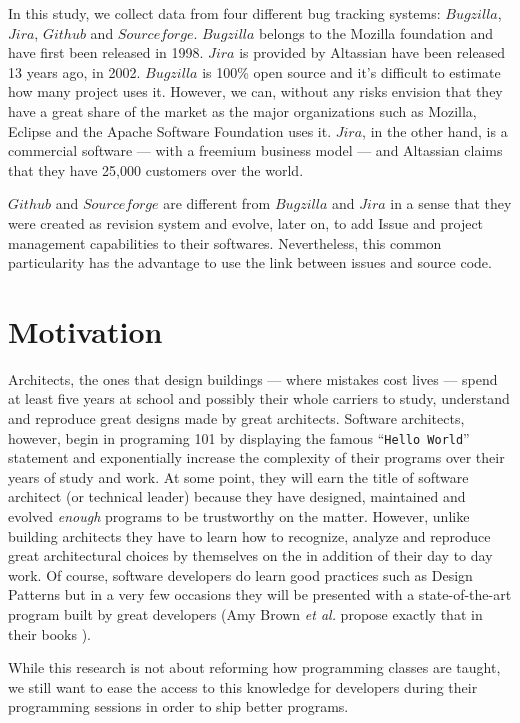  In this study, we collect data from four different bug tracking systems: $Bugzilla$, $Jira$, $Github$ and $Sourceforge$. $Bugzilla$ belongs to the Mozilla foundation and have first been released in 1998. $Jira$ is provided by Altassian have been released 13 years ago, in 2002. $Bugzilla$ is 100\% open source and it's difficult to estimate how many project uses it.
 However, we can, without any risks envision that they have a great share of the market as the major organizations such as Mozilla, Eclipse and the Apache Software Foundation uses it.
 $Jira$, in the other hand, is a commercial software --- with a freemium business model --- and Altassian claims that they have 25,000 customers over the world.

 $Github$ and $Sourceforge$ are different from $Bugzilla$ and $Jira$ in a sense that they were created as revision system and evolve, later on, to add Issue and project management capabilities to their softwares. Nevertheless, this common particularity has the advantage to use the link between issues and source code.



\section{Motivation}

Architects, the ones that design buildings --- where mistakes cost lives --- spend at least five years at school and possibly their whole carriers to study, understand and reproduce great designs made by great architects.
Software architects, however, begin in programing 101 by displaying the famous ``{\tt Hello World}'' statement and exponentially increase the complexity of their programs over their years of study and work.
At some point, they will earn the title of software architect (or technical leader) because they have designed, maintained and evolved {\it enough} programs to be trustworthy on the matter.
However, unlike building architects they have to learn how to recognize, analyze and reproduce great architectural choices by themselves on the in addition of their day to day work.
Of course, software developers do learn good practices such as Design Patterns \cite{Gamma2008} but in a very few occasions they will be presented with a state-of-the-art program built by great developers (Amy Brown {\it et al.} propose exactly that in their books \cite{chansler2011architecture, AmyBrown2012, Armstrong2013}).

While this research is not about reforming how programming classes are taught, we still want to ease the access to this knowledge for developers during their programming sessions in order to ship better programs.

